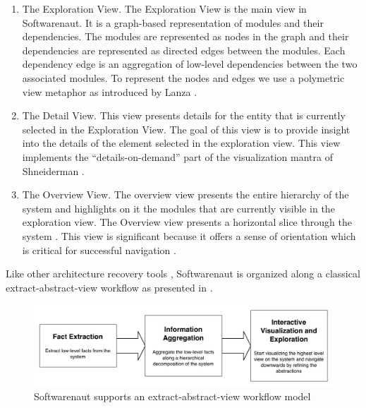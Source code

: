 \documentclass[preprint,12pt]{elsarticle}
\begin{document}
\begin{enumerate}
\item The Exploration View. The Exploration View is the main view in Softwarenaut. It is a graph-based representation of modules and their dependencies. The modules are represented as nodes in the graph and their dependencies are represented as directed edges between the modules. Each dependency edge is an aggregation of low-level dependencies between the two associated modules. To represent the nodes and edges we use a polymetric view metaphor as introduced by Lanza \cite{lanza-pv}. 

\item The Detail View. This view presents details for the entity that is currently selected in the Exploration View. The goal of this view is to provide insight into the details of the element selected in the exploration view. This view implements the ``details-on-demand'' part of the visualization mantra of Shneiderman \cite{shneid-eyes}.

\item The Overview View. The overview view presents the entire hierarchy of the system and highlights on it the modules that are currently visible in the exploration view. The Overview view presents a horizontal slice through the system \cite{wong-thesis}. %
This view is significant because it offers a sense of orientation which is critical for successful navigation \cite{storey-awareness}.

\end{enumerate}


Like other architecture recovery tools \cite{pollet-sar}, Softwarenaut is organized along a classical extract-abstract-view workflow as presented in .

\begin{figure}[h]
\begin{center}
\includegraphics[width=\linewidth]{images/SnautFlow}
\caption{Softwarenaut supports an extract-abstract-view workflow model}
\end{center}
\end{figure}
\end{document}
